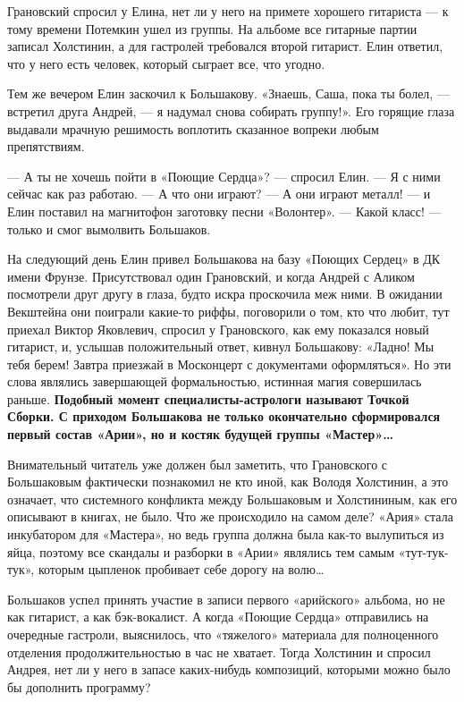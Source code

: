 \documentclass[16pt,a5paper]{book}
\begin{document}
Грановский спросил у Елина, нет ли у него на примете хорошего гитариста — к тому времени Потемкин ушел из группы. На
альбоме все гитарные партии записал Холстинин, а для гастролей требовался второй гитарист. Елин ответил, что у него есть
человек, который сыграет все, что угодно.

Тем же вечером Елин заскочил к Большакову. «Знаешь, Саша, пока ты болел, — встретил друга Андрей, — я надумал снова
собирать группу!». Его горящие глаза выдавали мрачную решимость воплотить сказанное вопреки любым препятствиям.

— А ты не хочешь пойти в «Поющие Сердца»? — спросил Елин. — Я с ними сейчас как раз работаю.
— А что они играют?
— А они играют металл! — и Елин поставил на магнитофон заготовку песни «Волонтер».
— Какой класс! — только и смог вымолвить Большаков.

На следующий день Елин привел Большакова на базу «Поющих Сердец» в ДК имени Фрунзе. Присутствовал один Грановский, и
когда Андрей с Аликом посмотрели друг другу в глаза, будто искра проскочила меж ними. В ожидании Векштейна они поиграли
какие-то риффы, поговорили о том, кто что любит, тут приехал Виктор Яковлевич, спросил у Грановского, как ему показался
новый гитарист, и, услышав положительный ответ, кивнул Большакову: «Ладно! Мы тебя берем! Завтра приезжай в Москонцерт с
документами оформляться». Но эти слова являлись завершающей формальностью, истинная магия совершилась раньше.
\textbf{Подобный момент специалисты-астрологи называют Точкой Сборки. С приходом Большакова не только окончательно
сформировался первый состав «Арии», но и костяк будущей группы «Мастер»\ldots}

Внимательный читатель уже должен был заметить, что Грановского с Большаковым фактически познакомил не кто иной, как
Володя Холстинин, а это означает, что системного конфликта между Большаковым и Холстининым, как его описывают в книгах,
не было. Что же происходило на самом деле? «Ария» стала инкубатором для «Мастера», но ведь группа должна была как-то
вылупиться из яйца, поэтому все скандалы и разборки в «Арии» являлись тем самым «тут-тук-тук», которым цыпленок
пробивает себе дорогу на волю\ldots

Большаков успел принять участие в записи первого «арийского» альбома, но не как гитарист, а как бэк-вокалист. А когда
«Поющие Сердца» отправились на очередные гастроли, выяснилось, что «тяжелого» материала для полноценного отделения
продолжительностью в час не хватает. Тогда Холстинин и спросил Андрея, нет ли у него в запасе каких-нибудь композиций,
которыми можно было бы дополнить программу?
\end{document}
